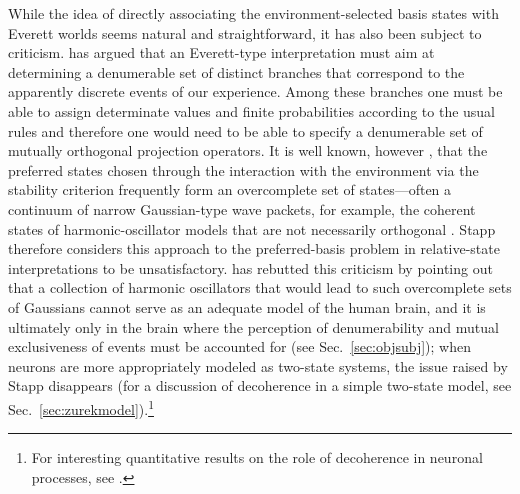 \documentclass[rmp,aps,amsmath,amsfonts,noshowkeys,noshowpacs,12pt]{revtex4}
\begin{document}
While the idea of directly associating the environment-selected basis
states with Everett worlds seems natural and straightforward, it has
also been subject to criticism. \citet{Stapp:2002:pc} has argued that
an Everett-type interpretation must aim at determining a denumerable
set of distinct branches that correspond to the apparently discrete
events of our experience. Among these branches one must be able to
assign determinate values and finite probabilities according to the
usual rules and therefore one would need to be able to specify a
denumerable set of mutually orthogonal projection operators.  It is
well known, however \citep{Zurek:1998:re}, that the preferred states
chosen through the interaction with the environment via the stability
criterion frequently form an overcomplete set of states---often a
continuum of narrow Gaussian-type wave packets, for example, the
coherent states of harmonic-oscillator models that are not necessarily
orthogonal \citetext{i.e., the Gaussians may overlap; see
  \citealp{Kubler:1973:ux,Zurek:1993:qq}}.  Stapp therefore considers
this approach to the preferred-basis problem in relative-state
interpretations to be unsatisfactory. \citet{Zurek:2003:uu} has
rebutted this criticism by pointing out that a collection of harmonic
oscillators that would lead to such overcomplete sets of Gaussians
cannot serve as an adequate model of the human brain, and it is
ultimately only in the brain where the perception of denumerability
and mutual exclusiveness of events must be accounted for (see
Sec.~\ref{sec:objsubj}); when neurons are more appropriately modeled
as two-state systems, the issue raised by Stapp disappears (for a
discussion of decoherence in a simple two-state model, see
Sec.~\ref{sec:zurekmodel}).\footnote{For interesting quantitative
  results on the role of decoherence in neuronal processes, see
  \citet{Tegmark:2000:wz}.}
\end{document}
